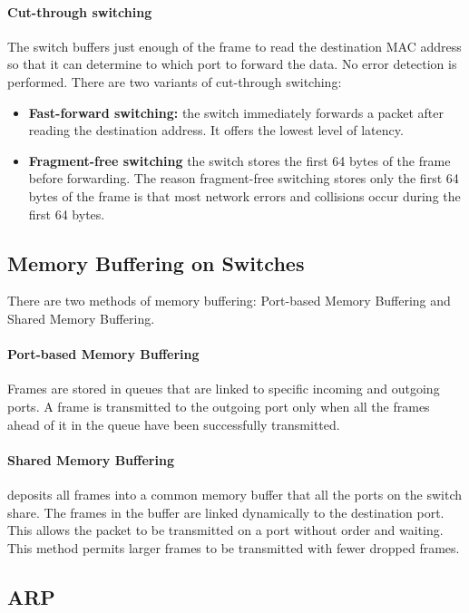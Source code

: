 \paragraph{Cut-through switching} The switch buffers just enough of the frame to read the destination MAC address so that it can determine to which port to forward the data. No error detection is performed. There are two variants of cut-through switching: 

\begin{itemize}
\item \textbf{Fast-forward switching:} the switch immediately forwards a packet after reading the destination address. It offers the lowest level of latency. 

\item \textbf{Fragment-free switching} the switch stores the first 64 bytes of the frame before forwarding. The reason fragment-free switching stores only the first 64 bytes of the frame is that most network errors and collisions occur during the first 64 bytes. 
\end{itemize}

\subsection{Memory Buffering on Switches}

There are two methods of memory buffering: Port-based Memory Buffering and Shared Memory Buffering.

\paragraph{Port-based Memory Buffering} Frames are stored in queues that are linked to specific incoming and outgoing ports. A frame is transmitted to the outgoing port only when all the frames ahead of it in the queue have been successfully transmitted. 

\paragraph{Shared Memory Buffering} deposits all frames into a common memory buffer that all the ports on the switch share.  The frames in the buffer are linked dynamically to the destination port. This allows the packet to be transmitted on a port without order and waiting. This method permits larger frames to be transmitted with fewer dropped frames. 

\subsection{ARP}

